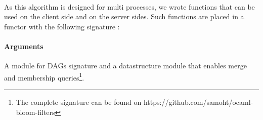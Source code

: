 \paragraph{} As this algorithm is designed for multi processes, we wrote functions that can be used on the client side and on the server sides. Such functions are placed in a functor with the following signature :
\paragraph{Arguments} A module for DAGs signature and a datastructure module that enables merge and membership queries\footnote{The complete signature can be found on https://github.com/samoht/ocaml-bloom-filters}.
